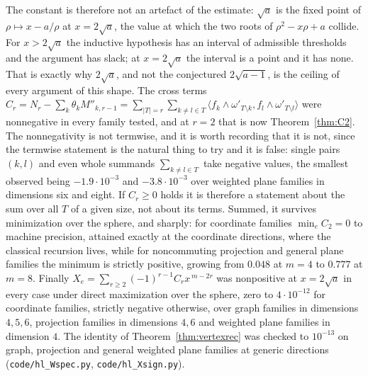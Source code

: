 \documentclass[11pt]{article}
\theoremstyle{remark}
\begin{document}
The constant is therefore not an artefact of the estimate: $\sqrt a$ is the fixed
point of $\rho\mapsto x-a/\rho$ at $x=2\sqrt a$, the value at which the two roots of
$\rho^2-x\rho+a$ collide. For $x>2\sqrt a$ the inductive hypothesis has an interval
of admissible thresholds and the argument has slack; at $x=2\sqrt a$ the interval is
a point and it has none. That is exactly why $2\sqrt a$, and not the conjectured
$2\sqrt{a-1}$, is the ceiling of every argument of this shape. The cross terms
$C_r=N_r-\sum_k\theta_kM''_{k,r-1}
=\sum_{|T|=r}\sum_{k\ne l\in T}\langle f_k\wedge\omega'_{T\setminus k},
f_l\wedge\omega'_{T\setminus l}\rangle$ were nonnegative in every family tested, and at
$r=2$ that is now Theorem~\ref{thm:C2}. The nonnegativity is not termwise, and it is
worth recording that it is not, since the termwise statement is the natural thing to try
and it is false: single pairs $(k,l)$
and even whole summands $\sum_{k\ne l\in T}$ take negative values, the smallest
observed being $-1.9\cdot10^{-3}$ and $-3.8\cdot10^{-3}$ over weighted plane
families in dimensions six and eight. If $C_r\ge0$ holds it is therefore a statement about the sum over all
$T$ of a given size, not about its terms. Summed, it survives minimization over the
sphere, and sharply: for coordinate families $\min_e C_2=0$ to machine precision,
attained exactly at the coordinate directions, where the classical recursion lives,
while for noncommuting projection and general plane families the minimum is strictly
positive, growing from $0.048$ at $m=4$ to $0.777$ at $m=8$. Finally
$X_e=\sum_{r\ge2}(-1)^{r-1}C_rx^{\,m-2r}$ was nonpositive at $x=2\sqrt a$ in every case
under direct maximization over the sphere, zero to $4\cdot10^{-12}$ for coordinate
families, strictly negative otherwise, over graph families in dimensions $4,5,6$,
projection families in dimensions $4,6$ and weighted plane families in dimension $4$.
The identity of Theorem~\ref{thm:vertexrec} was checked to $10^{-13}$ on graph,
projection and general weighted plane families at generic directions
(\texttt{code/hl\_Wspec.py}, \texttt{code/hl\_Xsign.py}).
\end{document}
